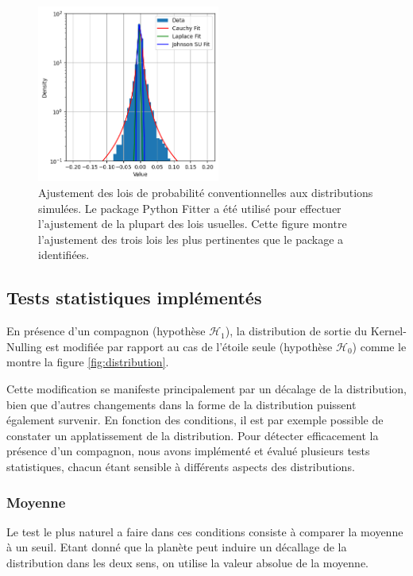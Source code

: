 \documentclass{article}
\begin{document}
\begin{figure}[H]
\centering
\includegraphics[width=6cm]{img/fits.png}
\caption{Ajustement des lois de probabilité conventionnelles aux distributions simulées. Le package Python Fitter a été utilisé pour effectuer l'ajustement de la plupart des lois usuelles. Cette figure montre l'ajustement des trois lois les plus pertinentes que le package a identifiées.}
\label{fig:fits}
\end{figure}



\subsection{Tests statistiques implémentés}

En présence d'un compagnon (hypothèse $\mathcal{H}_1$), la distribution de sortie du Kernel-Nulling est modifiée par rapport au cas de l'étoile seule (hypothèse $\mathcal{H}_0$) comme le montre la figure \ref{fig:distribution}.

Cette modification se manifeste principalement par un décalage de la distribution, bien que d'autres changements dans la forme de la distribution puissent également survenir. En fonction des conditions, il est par exemple possible de constater un applatissement de la distribution. Pour détecter efficacement la présence d'un compagnon, nous avons implémenté et évalué plusieurs tests statistiques, chacun étant sensible à différents aspects des distributions.

\subsubsection{Moyenne}

Le test le plus naturel a faire dans ces conditions consiste à comparer la moyenne à un seuil. Etant donné que la planète peut induire un décallage de la distribution dans les deux sens, on utilise la valeur absolue de la moyenne.
\end{document}
